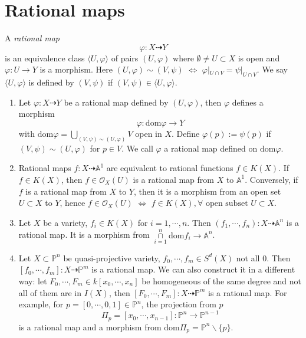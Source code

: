 \section{Rational maps}
\begin{definition}
	A \textit{rational map}
	$$
		\varphi:X\dashrightarrow Y
	$$
	is an equivalence class $ \langle U,\varphi\rangle $ of pairs $ (U,\varphi) $ where $ \emptyset\neq U\subset X $ is open and $ \varphi :U\to Y $ is a morphism. Here $ (U,\varphi)\sim(V,\psi) $ $ \Leftrightarrow $ $ \varphi|_{U\cap V}=\psi|_{U\cap V} $. We say $ \langle U,\varphi\rangle $ is defined by $ (V,\psi) $ if $ (V,\psi)\in \langle U,\varphi\rangle $.
\end{definition}
\begin{remark}
	\noindent\begin{enumerate}
		\item 	Let $ \varphi:X\dashrightarrow Y $ be a rational map defined by $ (U,\varphi) $, then $ \varphi $ defines a morphism
		      $$
			      \varphi:\text{dom}\varphi\to Y
		      $$
		      with $ \text{dom}\varphi=\mathop{\bigcup}\limits_{(V,\psi)\sim(U,\varphi)} V $ open in $ X $. Define $ \varphi(p):=\psi(p) $ if $ (V,\psi)\sim(U,\varphi) $ for $ p\in V $. We call $ \varphi $ a rational map defined on $ \text{dom}\varphi $.
		\item  Rational maps $ f:X\dashrightarrow \mathbb{A}^1 $ are equivalent to  rational functions $ f\in K(X) $. If $ f\in K(X) $, then $ f\in \mathcal{O}_X(U) $ is a rational map from $ X $ to $ \mathbb{A}^1 $. Conversely, if $ f $ is a rational map from $ X $ to $ Y $, then it is a morphism from an open set $ U\subset X $ to $ Y $, hence $ f\in \mathcal{O}_X(U) $ $ \Leftrightarrow $ $ f\in K(X),\forall \text{ open subset }U\subset X$.
		\item Let $ X $ be a variety, $ f_i\in K(X) $ for  $ i=1,\cdots,n $. Then $ (f_1,\cdots,f_n):X\dashrightarrow \mathbb{A}^n $ is a rational map. It is a morphism from $ \mathop{\cap}\limits_{i=1}^{n}\text{dom}f_i\to \mathbb{A}^n $.
		\item Let $ X\subset \mathbb{P}^n $ be quasi-projective variety, $ f_0,\cdots,f_m\in S^d(X) $  not all $ 0 $. Then $ [f_0,\cdots,f_m]:X\dashrightarrow \mathbb{P}^m $ is a rational map. We can also construct it in a different way: let $ F_0,\cdots,F_m\in k[x_0,\cdots,x_n] $ be homogeneous of the same degree and not all of them are in $ I(X) $, then $ [F_0,\cdots,F_m]:X\dashrightarrow \mathbb{P}^m $ is a rational map. For example,  for $ p=[0,\cdots,0,1]\in \mathbb{P}^n $, the projection from $ p $
		      $$
			      \Pi_p=[x_0,\cdots,x_{n-1}]:\mathbb{P}^n\to \mathbb{P}^{n-1}
		      $$
		      is a rational map and a morphism  from $ \text{dom}\Pi_p=\mathbb{P}^n\backslash \{ p \} $.
	\end{enumerate}
\end{remark}
